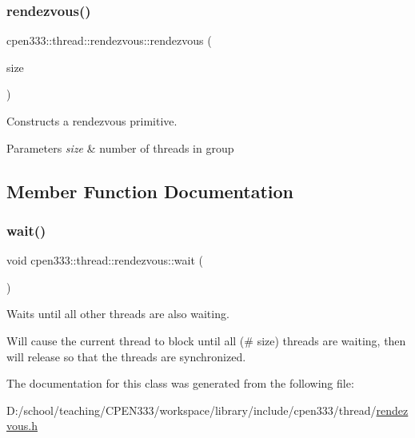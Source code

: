 \subsubsection{\texorpdfstring{rendezvous()}{rendezvous()}}
{\footnotesize\ttfamily cpen333\+::thread\+::rendezvous\+::rendezvous (\begin{DoxyParamCaption}\item[{size\+\_\+t}]{size }\end{DoxyParamCaption})\hspace{0.3cm}{\ttfamily [inline]}}



Constructs a rendezvous primitive. 


\begin{DoxyParams}{Parameters}
{\em size} & number of threads in group \\
\hline
\end{DoxyParams}


\subsection{Member Function Documentation}
\mbox{\label{classcpen333_1_1thread_1_1rendezvous_ad712b180014e24f3b33707726984c365}} 
\subsubsection{\texorpdfstring{wait()}{wait()}}
{\footnotesize\ttfamily void cpen333\+::thread\+::rendezvous\+::wait (\begin{DoxyParamCaption}{ }\end{DoxyParamCaption})\hspace{0.3cm}{\ttfamily [inline]}}



Waits until all other threads are also waiting. 

Will cause the current thread to block until all (\# size) threads are waiting, then will release so that the threads are synchronized. 

The documentation for this class was generated from the following file\+:\begin{DoxyCompactItemize}
\item 
D\+:/school/teaching/\+C\+P\+E\+N333/workspace/library/include/cpen333/thread/\hyperlink{thread_2rendezvous_8h}{rendezvous.\+h}\end{DoxyCompactItemize}
